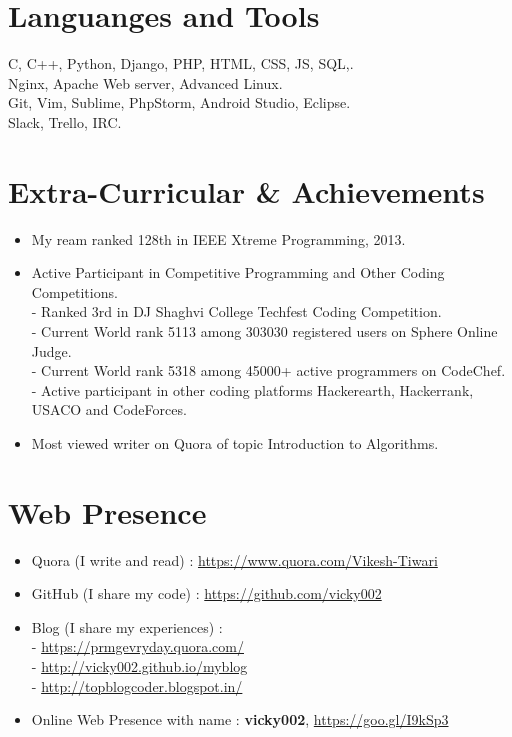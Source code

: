 \documentclass[margin,line]{res}
\begin{document}
\begin{resume}
\section{Languanges and Tools}
C, C++, Python, Django, PHP, HTML, CSS, JS, SQL,.\\
Nginx, Apache Web server, Advanced Linux.\\ 
Git, Vim, Sublime, PhpStorm, Android Studio, Eclipse.\\
Slack, Trello, IRC.\\


\section{Extra-Curricular \& Achievements}

\begin{itemize} \itemsep -4pt
 \item My ream ranked 128th in IEEE Xtreme Programming, 2013.\\
 \item Active Participant in Competitive Programming and Other Coding Competitions. \\
 - Ranked 3rd in DJ Shaghvi College Techfest Coding Competition.\\
 - Current World rank 5113 among 303030 registered users on Sphere Online Judge. \\
 - Current World rank 5318 among 45000+ active programmers on CodeChef.\\
 - Active participant in other coding platforms Hackerearth, Hackerrank, USACO and CodeForces.
\item Most viewed writer on Quora of topic Introduction to Algorithms.
\end{itemize}




\section{Web Presence}
\begin{itemize} \itemsep -4pt
 \item Quora (I write and read) : \url{https://www.quora.com/Vikesh-Tiwari}\\
 \item GitHub (I share my code) : \url{https://github.com/vicky002}\\
 \item Blog (I share my experiences) : \\ 
 - \url{https://prmgevryday.quora.com/}\\
 - \url{http://vicky002.github.io/myblog}\\
 - \url{http://topblogcoder.blogspot.in/}\\
 \item Online Web Presence with name : \textbf{vicky002}, \url{https://goo.gl/I9kSp3}\\
\end{itemize}







\end{resume}
\end{document}
